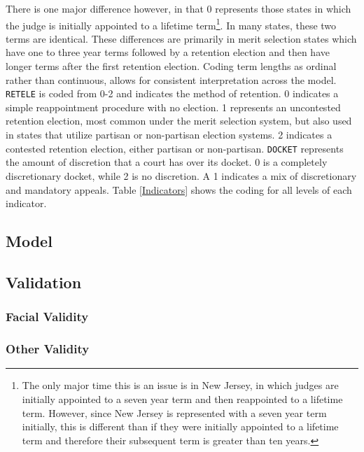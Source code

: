 \documentclass[12pt]{article}
\begin{document}
There is one major difference however, in that 0 represents those states in which the judge is initially appointed to a lifetime term\footnote{The only major time this is an issue is in New Jersey, in which judges are initially appointed to a seven year term and then reappointed to a lifetime term.  However, since New Jersey is represented with a seven year term initially, this is different than if they were initially appointed to a lifetime term and therefore their subsequent term is greater than ten years.}.  In many states, these two terms are identical.  These differences are primarily in merit selection states which have one to three year terms followed by a retention election and then have longer terms after the first retention election.  Coding term lengths as ordinal rather than continuous, allows for consistent interpretation across the model.  \texttt{RETELE} is coded from 0-2 and indicates the method of retention.  0 indicates a simple reappointment procedure with no election.  1 represents an uncontested retention election, most common under the merit selection system, but also used in states that utilize partisan or non-partisan election systems.  2 indicates a contested retention election, either partisan or non-partisan.  \texttt{DOCKET} represents the amount of discretion that a court has over its docket.  0 is a completely discretionary docket, while 2 is no discretion.  A 1 indicates a mix of discretionary and mandatory appeals. Table \ref{Indicators} shows the coding for all levels of each indicator. 

\subsection*{Model}


\subsection*{Validation}
\subsubsection*{Facial Validity}



\subsubsection*{Other Validity}
\end{document}
